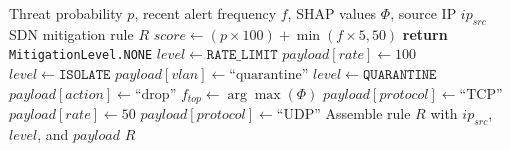 \documentclass{article}
\begin{document}
\begin{algorithm}[H]
\caption{Autonomous XAI-driven SDN Mitigation}
\begin{algorithmic}[1]
\REQUIRE Threat probability $p$, recent alert frequency $f$, SHAP values $\Phi$, source IP $ip_{src}$
\ENSURE SDN mitigation rule $R$
\STATE $score \leftarrow (p \times 100) + \min(f \times 5, 50)$ 
    \STATE \textbf{return} \texttt{MitigationLevel.NONE}
    \STATE $level \leftarrow \texttt{RATE\_LIMIT}$
    \STATE $payload[rate] \leftarrow 100$
    \STATE $level \leftarrow \texttt{ISOLATE}$
    \STATE $payload[vlan] \leftarrow \text{``quarantine''}$
\ELSE
    \STATE $level \leftarrow \texttt{QUARANTINE}$
    \STATE $payload[action] \leftarrow \text{``drop''}$
\ENDIF
\STATE $f_{top} \leftarrow \arg\max(\Phi)$ 
    \STATE $payload[protocol] \leftarrow \text{``TCP''}$
        \STATE $payload[rate] \leftarrow 50$ 
    \ENDIF
{}
    \STATE $payload[protocol] \leftarrow \text{``UDP''}$
\ENDIF
\STATE Assemble rule $R$ with $ip_{src}$, $level$, and $payload$
\RETURN $R$
\end{algorithmic}
\end{algorithm}
\end{document}
